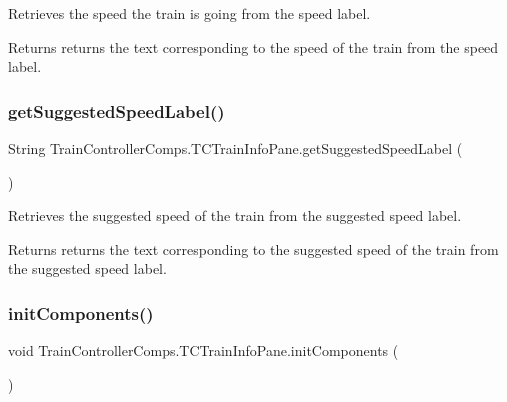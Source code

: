 Retrieves the speed the train is going from the speed label. 

\begin{DoxyReturn}{Returns}
returns the text corresponding to the speed of the train from the speed label. 
\end{DoxyReturn}
\mbox{\label{classTrainControllerComps_1_1TCTrainInfoPane_ae8aae7010c588984b4bdc7f1422e1d3e}} 
\subsubsection{\texorpdfstring{get\+Suggested\+Speed\+Label()}{getSuggestedSpeedLabel()}}
{\footnotesize\ttfamily String Train\+Controller\+Comps.\+T\+C\+Train\+Info\+Pane.\+get\+Suggested\+Speed\+Label (\begin{DoxyParamCaption}{ }\end{DoxyParamCaption})}



Retrieves the suggested speed of the train from the suggested speed label. 

\begin{DoxyReturn}{Returns}
returns the text corresponding to the suggested speed of the train from the suggested speed label. 
\end{DoxyReturn}
\mbox{\label{classTrainControllerComps_1_1TCTrainInfoPane_a875ccb16a90d10cc999f0c274824778e}} 
\subsubsection{\texorpdfstring{init\+Components()}{initComponents()}}
{\footnotesize\ttfamily void Train\+Controller\+Comps.\+T\+C\+Train\+Info\+Pane.\+init\+Components (\begin{DoxyParamCaption}{ }\end{DoxyParamCaption})\hspace{0.3cm}{\ttfamily [private]}}



